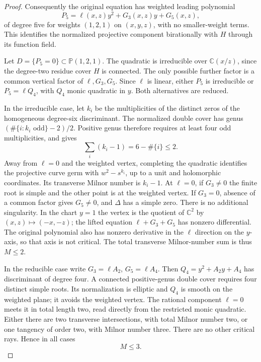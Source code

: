 \begin{proof}
Consequently the original equation has weighted
leading polynomial
\[
          P_5=\ell(x,z)y^2+G_3(x,z)y+G_5(x,z),               \tag{4.53b}
\]
of degree five for weights $(1,2,1)$ on $(x,y,z)$,
with no smaller-weight terms. This identifies the
normalized projective component birationally with
$H$ through its function field.

Let $D=\{P_5=0\}\subset\mathbb P(1,2,1)$.
The quadratic is irreducible over $\mathbb C(x/z)$,
since the degree-two residue cover $H$ is connected.
The only possible further factor is a common
vertical factor of $\ell,G_3,G_5$. Since $\ell$
is linear, either $P_5$ is irreducible or
$P_5=\ell Q_4$, with $Q_4$ monic quadratic in $y$.
Both alternatives are reduced.

In the irreducible case, let $k_i$ be the
multiplicities of the distinct zeros of the
homogeneous degree-six discriminant. The normalized
double cover has genus
$(\#\{i:k_i\text{ odd}\}-2)/2$. Positive genus
therefore requires at least four odd multiplicities,
and gives
\[
              \sum_i(k_i-1)=6-\#\{i\}\le2.                  \tag{4.53c}
\]
Away from $\ell=0$ and the weighted vertex,
completing the quadratic identifies the projective
curve germ with $w^2-s^{k_i}$, up to a unit and
holomorphic coordinates. Its transverse Milnor
number is $k_i-1$. At $\ell=0$, if $G_3\ne0$ the
finite root is simple and the other point is at
the weighted vertex. If $G_3=0$, absence of a
common factor gives $G_5\ne0$, and $\Delta$ has
a simple zero. There is no additional singularity.
In the chart $y=1$ the vertex is the quotient of
$\mathbb C^2$ by $(x,z)\mapsto(-x,-z)$; the
lifted equation $\ell+G_3+G_5$ has nonzero
differential. The original polynomial also has
nonzero derivative in the $\ell$ direction on
the $y$-axis, so that axis is not critical.
The total transverse Milnor-number sum is thus
$M\le2$.

In the reducible case write
$G_3=\ell A_2$, $G_5=\ell A_4$. Then
$Q_4=y^2+A_2y+A_4$ has discriminant of degree four.
A connected positive-genus double cover requires
four distinct simple roots. Its normalization is
elliptic and $Q_4$ is smooth on the weighted plane;
it avoids the weighted vertex. The rational
component $\ell=0$ meets it in total length two,
read directly from the restricted monic quadratic.
Either there are two transverse intersections,
with total Milnor number two, or one tangency of
order two, with Milnor number three. There are no
other critical rays. Hence in all cases
\[
                              M\le3.                       \tag{4.53d}
\]


\end{proof}
